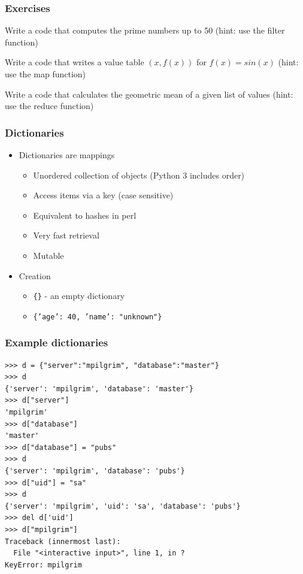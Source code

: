 \documentclass{beamer}
\begin{document}
\begin{frame}
\frametitle{Exercises}
\begin{example}
Write a code that computes the prime numbers up to 50
(hint: use the filter function)
\end{example}
\begin{example}
Write a code that writes a value table $(x,f(x))$ for $f(x)=sin(x)$
(hint: use the map function)
\end{example}
\begin{example}
Write a code that calculates the geometric mean of a given list of values
(hint: use the reduce function)
\end{example}
\end{frame}

\begin{frame}
\frametitle{Dictionaries}
\begin{itemize}
\item Dictionaries are mappings
\begin{itemize}
\item Unordered collection of objects (Python 3 includes order)
\item Access items via a key (case sensitive)
\item Equivalent to hashes in perl
\item Very fast retrieval
\item Mutable
\end{itemize}
\item Creation
\begin{itemize}
\item \texttt{\{\}} - an empty dictionary
\item \texttt{\{'age': 40, 'name': "unknown"\}}
\end{itemize}
\end{itemize}
\end{frame}

\begin{frame}[containsverbatim]
\frametitle{Example dictionaries}
\begin{lstlisting}
>>> d = {"server":"mpilgrim", "database":"master"} 
>>> d
{'server': 'mpilgrim', 'database': 'master'}
>>> d["server"]                                    
'mpilgrim'
>>> d["database"]                                  
'master'
>>> d["database"] = "pubs" 
>>> d
{'server': 'mpilgrim', 'database': 'pubs'}
>>> d["uid"] = "sa"        
>>> d
{'server': 'mpilgrim', 'uid': 'sa', 'database': 'pubs'}
>>> del d['uid']
>>> d["mpilgrim"]                                  
Traceback (innermost last):
  File "<interactive input>", line 1, in ?
KeyError: mpilgrim
\end{lstlisting}
\end{frame}
\end{document}
